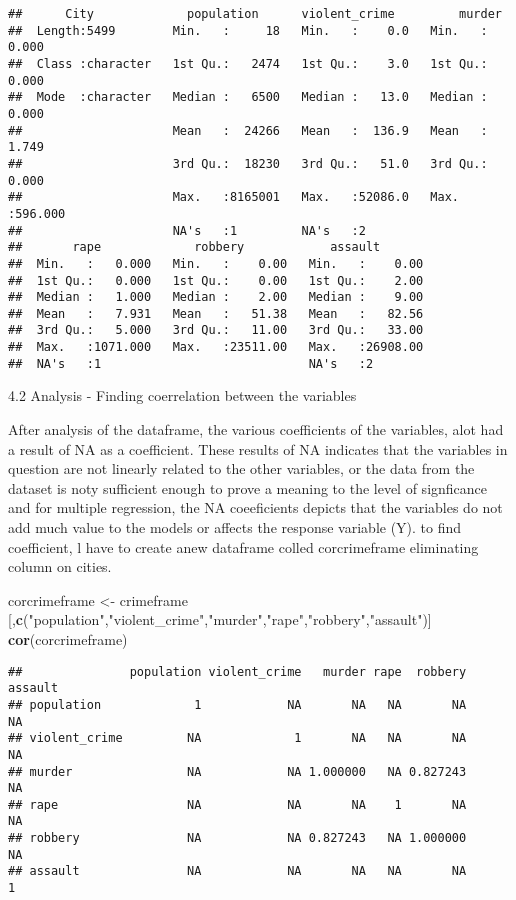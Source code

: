 \documentclass[]{article}
\newenvironment{Shaded}{\begin{snugshade}}{\end{snugshade}}
\newcommand{\KeywordTok}[1]{\textcolor[rgb]{0.13,0.29,0.53}{\textbf{#1}}}
\newcommand{\StringTok}[1]{\textcolor[rgb]{0.31,0.60,0.02}{#1}}
\newcommand{\NormalTok}[1]{#1}
\begin{document}
\begin{verbatim}
##      City             population      violent_crime         murder       
##  Length:5499        Min.   :     18   Min.   :    0.0   Min.   :  0.000  
##  Class :character   1st Qu.:   2474   1st Qu.:    3.0   1st Qu.:  0.000  
##  Mode  :character   Median :   6500   Median :   13.0   Median :  0.000  
##                     Mean   :  24266   Mean   :  136.9   Mean   :  1.749  
##                     3rd Qu.:  18230   3rd Qu.:   51.0   3rd Qu.:  0.000  
##                     Max.   :8165001   Max.   :52086.0   Max.   :596.000  
##                     NA's   :1         NA's   :2                          
##       rape             robbery            assault        
##  Min.   :   0.000   Min.   :    0.00   Min.   :    0.00  
##  1st Qu.:   0.000   1st Qu.:    0.00   1st Qu.:    2.00  
##  Median :   1.000   Median :    2.00   Median :    9.00  
##  Mean   :   7.931   Mean   :   51.38   Mean   :   82.56  
##  3rd Qu.:   5.000   3rd Qu.:   11.00   3rd Qu.:   33.00  
##  Max.   :1071.000   Max.   :23511.00   Max.   :26908.00  
##  NA's   :1                             NA's   :2
\end{verbatim}

4.2 Analysis - Finding coerrelation between the variables

After analysis of the dataframe, the various coefficients of the
variables, alot had a result of NA as a coefficient. These results of NA
indicates that the variables in question are not linearly related to the
other variables, or the data from the dataset is noty sufficient enough
to prove a meaning to the level of signficance and for multiple
regression, the NA coeeficients depicts that the variables do not add
much value to the models or affects the response variable (Y). to find
coefficient, l have to create anew dataframe colled corcrimeframe
eliminating column on cities.

\begin{Shaded}
\begin{Highlighting}[]
\NormalTok{corcrimeframe <-}\StringTok{ }\NormalTok{crimeframe [,}\KeywordTok{c}\NormalTok{(}\StringTok{"population"}\NormalTok{,}\StringTok{"violent_crime"}\NormalTok{,}\StringTok{"murder"}\NormalTok{,}\StringTok{"rape"}\NormalTok{,}\StringTok{"robbery"}\NormalTok{,}\StringTok{"assault"}\NormalTok{)]}
\KeywordTok{cor}\NormalTok{(corcrimeframe)}
\end{Highlighting}
\end{Shaded}

\begin{verbatim}
##               population violent_crime   murder rape  robbery assault
## population             1            NA       NA   NA       NA      NA
## violent_crime         NA             1       NA   NA       NA      NA
## murder                NA            NA 1.000000   NA 0.827243      NA
## rape                  NA            NA       NA    1       NA      NA
## robbery               NA            NA 0.827243   NA 1.000000      NA
## assault               NA            NA       NA   NA       NA       1
\end{verbatim}
\end{document}
